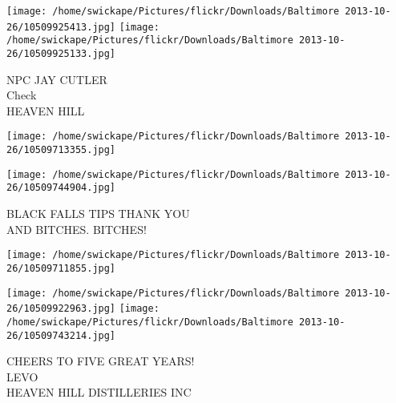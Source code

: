 \documentclass[10pt,letterpaper]{article}
\begin{document}
\vspace{0.25in}
\texttt{[image: /home/swickape/Pictures/flickr/Downloads/Baltimore 2013-10-26/10509925413.jpg]}
\texttt{[image: /home/swickape/Pictures/flickr/Downloads/Baltimore 2013-10-26/10509925133.jpg]}

NPC JAY CUTLER\\
Check\\
HEAVEN HILL
\pagebreak

\texttt{[image: /home/swickape/Pictures/flickr/Downloads/Baltimore 2013-10-26/10509713355.jpg]}

\vspace{0.25in}
\texttt{[image: /home/swickape/Pictures/flickr/Downloads/Baltimore 2013-10-26/10509744904.jpg]}

BLACK FALLS TIPS THANK YOU\\
AND BITCHES.  BITCHES!
\pagebreak

\texttt{[image: /home/swickape/Pictures/flickr/Downloads/Baltimore 2013-10-26/10509711855.jpg]}

\vspace{0.25in}
\texttt{[image: /home/swickape/Pictures/flickr/Downloads/Baltimore 2013-10-26/10509922963.jpg]}
\texttt{[image: /home/swickape/Pictures/flickr/Downloads/Baltimore 2013-10-26/10509743214.jpg]}

CHEERS TO FIVE GREAT YEARS!\\
LEVO\\
HEAVEN HILL DISTILLERIES INC
\pagebreak
\end{document}
